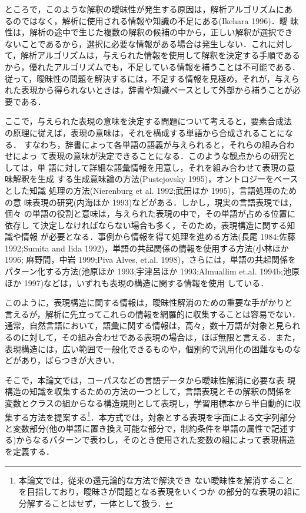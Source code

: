 ところで，このような解釈の曖昧性が発生する原因は，解析アルゴリズムにあ
るのではなく，解析に使用される情報や知識の不足にある(Ikehara 1996)．曖
昧性は，解析の途中で生じた複数の解釈の候補の中から，正しい解釈が選択でき
ないことであるから，選択に必要な情報がある場合は発生しない．これに対し
て，解析アルゴリズムは，与えられた情報を使用して解釈を決定する手順である
から，優れたアルゴリズムでも，不足している情報を補うことは不可能である．
従って，曖昧性の問題を解決するには，不足する情報を見極め，それが，与えら
れた表現から得られないときは，辞書や知識ベースとして外部から補うことが必
要である．

ここで，与えられた表現の意味を決定する問題について考えると，要素合成法
の原理に従えば，表現の意味は，それを構成する単語から合成されることになる．
すなわち，辞書によって各単語の語義が与えられると，それらの組み合わせによっ
て表現の意味が決定できることになる．このような観点からの研究としては，単
語に対して詳細な語彙情報を用意し，それを組み合わせて表現の意味解釈を生成
する生成意味論の方法(Pustejovsky 1995)，オントロジーをベースとした知識
処理の方法(Nierenburg et al. 1992;武田ほか 1995)，言語処理のための意
味表現の研究(内海ほか 1993)などがある．しかし，現実の言語表現では，個々
の単語の役割と意味は，与えられた表現の中で，その単語が占める位置に依存し
て決定しなければならない場合も多く，そのため，表現構造に関する知識や情報
が必要となる．事例から情報を得て処理を進める方法(長尾 1984;佐藤 1992;Sumita and Iida 1992)，単語の共起関係の情報を使用する方法(小林ほか 1996;
麻野間，中岩 1999;Piva Alves, et.al. 1998)，さらには，単語の共起関係を
パターン化する方法(池原ほか 1993;宇津呂ほか 1993;Almuallim
et.al. 1994b;池原ほか 1997)などは，いずれも表現の構造に関する情報を使用
している．

このように，表現構造に関する情報は，曖昧性解消のための重要な手がかりと
言えるが，解析に先立ってこれらの情報を網羅的に収集することは容易でない．
通常，自然言語において，語彙に関する情報は，高々，数十万語が対象と見られ
るのに対して，その組み合わせである表現の場合は，ほぼ無限と言える．また，
表現構造には，広い範囲で一般化できるものや，個別的で汎用化の困難なものな
どがあり，ばらつきが大きい．

そこで，本論文では，コーパスなどの言語データから曖昧性解消に必要な表
現構造の知識を収集するための方法の一つとして，言語表現とその解釈の関係を
変数とクラスの組からなる構造規則として表現し，学習用標本から半自動的に収
集する方法を提案する\footnote{本論文では，従来の還元論的な方法で解決でき
ない曖昧性を解消することを目指しており，曖昧さが問題となる表現をいくつか
の部分的な表現の組に分解することはせず，一体として扱う．}．本方式では，対象とする表現を字面による文字列部分
と変数部分(他の単語に置き換え可能な部分で，制約条件を単語の属性で記述す
る)からなるパターンで表わし，そのとき使用された変数の組によって表現構造
を定義する．

